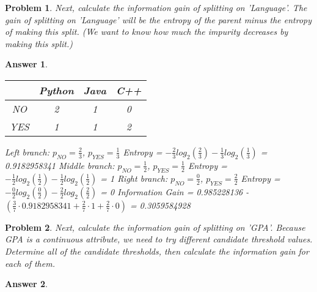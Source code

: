 \documentclass[11pt]{article}
\theoremstyle{description}
\newtheorem{problem}{Problem}
\theoremstyle{break}
\newtheorem*{answer}{Answer}
\begin{document}
    \begin{problem}
        Next, calculate the information gain of splitting on 'Language'.
        The gain of splitting on 'Language' will be the entropy of the parent minus the entropy of
        making this split.
        (We want to know how much the impurity decreases by making this split.)
    \end{problem}
    \begin{answer}
        \begin{tabular}{c|c|c|c}
             & Python & Java & C++ \\
            \hline
            NO & 2 & 1 & 0\\
            YES & 1 & 1 & 2\\
        \end{tabular}\newline
        Left branch: $p_{NO} = \frac{2}{3}$, $p_{YES} = \frac{1}{3}$\newline
        Entropy = $-\frac{2}{3}log_{2}(\frac{2}{3}) - \frac{1}{3}log_{2}(\frac{1}{3})$\newline
        = 0.9182958341\newline
        Middle branch: $p_{NO} = \frac{1}{2}$, $p_{YES} = \frac{1}{2}$\newline
        Entropy = $-\frac{1}{2}log_{2}(\frac{1}{2}) - \frac{1}{2}log_{2}(\frac{1}{2})$\newline
        = 1\newline
        Right branch: $p_{NO} = \frac{0}{2}$, $p_{YES} = \frac{2}{2}$\newline
        Entropy = $-\frac{0}{2}log_{2}(\frac{0}{2}) - \frac{2}{2}log_{2}(\frac{2}{2})$\newline
        = 0\newline
        Information Gain = 0.985228136 -
        $(\frac{3}{7}\cdot 0.9182958341 + \frac{2}{7}\cdot 1 + \frac{2}{7}\cdot 0)$\newline
        = 0.3059584928\newline
    \end{answer}

    \begin{problem}
        Next, calculate the information gain of splitting on 'GPA'.
        Because GPA is a continuous attribute, we need to try different candidate threshold values.
        Determine all of the candidate thresholds, then calculate the information gain for each
        of them.
    \end{problem}
    \begin{answer}
    \end{answer}
\end{document}
